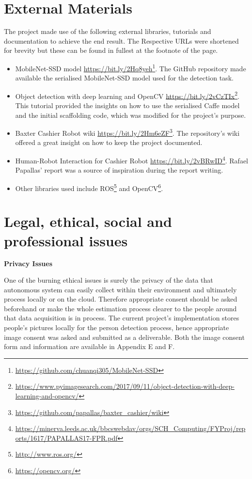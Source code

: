 \begin{appendices}
\chapter{External Materials}

The project made use of the following external libraries, tutorials and documentation to achieve the end result. The Respective URLs were shortened for brevity but these can be found in fullest at the footnote of the page.

\begin{itemize}
  \item MobileNet-SSD model \url{https://bit.ly/2Hq8yeh}\footnote{\url{https://github.com/chuanqi305/MobileNet-SSD}}. The GitHub repository made available the serialised MobileNet-SSD model used for the detection task. 
  \item Object detection with deep learning and OpenCV \url{https://bit.ly/2vCzTIx}\footnote{\url{https://www.pyimagesearch.com/2017/09/11/object-detection-with-deep-learning-and-opencv/}}. This tutorial provided the insights on how to use the serialised Caffe model and the initial scaffolding code, which was modified for the project's purpose.
  \item Baxter Cashier Robot wiki \url{https://bit.ly/2Hm6eZF}\footnote{\url{https://github.com/papallas/baxter_cashier/wiki}}. The repository's wiki offered a great insight on how to keep the project documented.
  \item Human-Robot Interaction for Cashier Robot \url{https://bit.ly/2vBRwID}\footnote{\url{https://minerva.leeds.ac.uk/bbcswebdav/orgs/SCH_Computing/FYProj/reports/1617/PAPALLAS17-FPR.pdf}}. Rafael Papallas' report was a source of inspiration during the report writing.
  \item Other libraries used include ROS\footnote{\url{http://www.ros.org/}} and OpenCV\footnote{\url{https://opencv.org/}}.
\end{itemize}

\chapter{Legal, ethical, social and professional issues}

\textbf{Privacy Issues}

One of the burning ethical issues is surely the privacy of the data that autonomous system can easily collect within their environment and ultimately process locally or on the cloud. Therefore appropriate consent should be asked beforehand or make the whole estimation process clearer to the people around that data acquisition is in process. The current project's implementation stores people's pictures locally for the person detection process, hence appropriate image consent was asked and submitted as a deliverable. Both the image consent form and information are available in Appendix E and F. 


\end{appendices}
